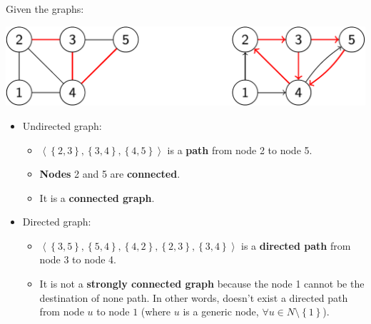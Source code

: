 \highspace
\begin{examplebox}
    Given the graphs:
    
    \begin{center}
        \includegraphics[width=.8\textwidth]{img/graphs-3.pdf}
    \end{center}

    \begin{itemize}
        \item Undirected graph:
        \begin{itemize}
            \item $\left\langle \left\{2,3\right\}, \left\{3,4\right\}, \left\{4,5\right\} \right\rangle$ is a \textbf{path} from node 2 to node 5.
            \item \textbf{Nodes} 2 and 5 are \textbf{connected}.
            \item It is a \textbf{connected graph}.
        \end{itemize}

        \item Directed graph:
        \begin{itemize}
            \item $\left\langle \left\{3,5\right\}, \left\{5,4\right\}, \left\{4,2\right\}, \left\{2,3\right\}, \left\{3,4\right\} \right\rangle$ is a \textbf{directed path} from node 3 to node 4.
            
            \item It is not a \textbf{strongly connected graph} because the node 1 cannot be the destination of none path. In other words, doesn't exist a directed path from node $u$ to node $1$ (where $u$ is a generic node, $\forall u \in N \setminus \left\{1\right\}$).
        \end{itemize}
    \end{itemize}
\end{examplebox}

